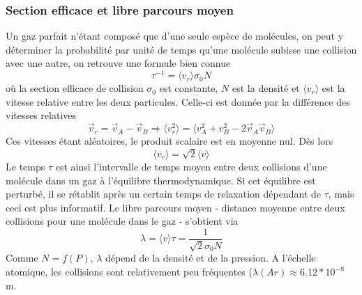 		\subsubsection{Section efficace et libre parcours moyen}
		Un gaz parfait n'étant composé que d'une seule espèce de molécules, on peut y déterminer 
		la probabilité par unité de temps qu'une molécule subisse une collision avec une autre, 
		on retrouve une formule bien connue
		\begin{equation}
		\tau^{-1}=\langle v_r\rangle\sigma_0 N
		\end{equation}				
		où la section efficace de collision $\sigma_0$ est constante, $N$ est la densité et 
		$\langle v_r\rangle$ est la vitesse relative entre les deux particules. Celle-ci est 
		donnée par la différence des vitesses relatives
		\begin{equation}
		\overrightarrow{v}_r=\overrightarrow{v}_A-\overrightarrow{v}_B \Rightarrow \langle
		 v_r^2\rangle=\langle v_A^2+v_B^2-2\overrightarrow{v}_A\overrightarrow{v}_B\rangle
		\end{equation}
		Ces vitesses étant aléatoires, le produit scalaire est en moyenne nul. Dès lors
		\begin{equation}
		\langle v_r\rangle = \sqrt{2}\langle v\rangle
		\end{equation}
		Le temps $\tau$ est ainsi l'intervalle de temps moyen entre deux collisions d'une 
		molécule dans un gaz à l'équilibre thermodynamique. Si cet équilibre est perturbé, il 
		se rétablit après un certain temps de relaxation dépendant de $\tau$, mais ceci est plus 
		informatif. Le libre parcours moyen - distance moyenne entre deux collisions pour une 
		molécule dans le gaz - s'obtient via
		\begin{equation}
		\lambda=\langle v \rangle\tau=\frac{1}{\sqrt{2}\sigma_0 N}
		\end{equation}
		Comme $N=f(P)$, $\lambda$ dépend de la densité et de la pression. A l'échelle atomique, les
		collisions sont relativement peu fréquentes ($\lambda(Ar) \approx 6.12*10^{-8}$ m.

